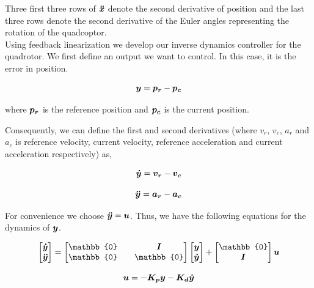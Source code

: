 \documentclass[12pt,fleqn]{article}
\newcommand{\mbm}[1]{\mbox{\boldmath $#1$}}
\begin{document}
Three first three rows of $\mbm{\ddot{x}}$ denote the second derivative of
position and the last three rows denote the second derivative of the
Euler angles representing the rotation of the quadcoptor.\\

Using feedback linearization we develop our inverse dynamics
controller for the quadrotor. We first define an output we want to
control. In this case, it is the error in position.

\begin{equation} \label{y}
$$ \mbm{y} = \mbm{p_r} - \mbm{p_c} $$ 
\end{equation}

where $\mbm{p_r}$ is the reference position and $\mbm{p_c}$ is the current
position.

Consequently, we can define the first and second derivatives (where
$v_r$, $v_c$, $a_r$ and $a_c$ is reference velocity, current velocity,
reference acceleration and current acceleration respectively) as,

\begin{equation} \label{ydot}
$$ \mbm{\dot{y}} = \mbm{v_r} - \mbm{v_c} $$
\end{equation}

\begin{equation} \label{accel}
$$ \mbm{\ddot{y}} = \mbm{a_r} - \mbm{a_c} $$
\end{equation}

For convenience we choose $\mbm{\ddot{y}} = \mbm{u}$. Thus, we have
the following equations for the dynamics of $\mbm{y}$.

\begin{equation} \label{y_dynamics}
$$ \begin{bmatrix} \mbm{\dot{y}} \\ \mbm{\ddot{y}} \end{bmatrix}
= \begin{bmatrix} \mathbb{0} && \mbm{I} \\ \mathbb{0} &&
  \mathbb{0} \end{bmatrix} \begin{bmatrix} \mbm{y} \\
  \mbm{\dot{y}}\end{bmatrix} + \begin{bmatrix} \mathbb{0}  \\
  \mbm{I} \end{bmatrix} \mbm{u}$$
\end{equation}

\begin{equation} \label{statefeedback}
$$ \mbm{u} = -\mbm{K_p}\mbm{y} - \mbm{K_d}\mbm{\dot{y}} $$
\end{equation}
\end{document}
